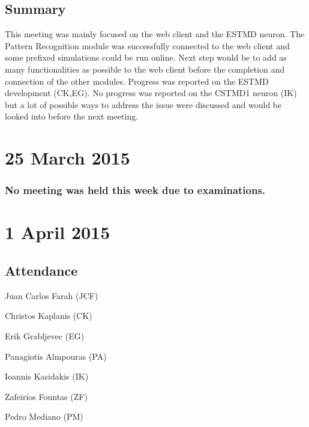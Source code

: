\documentclass[a4paper,11pt]{article}
\begin{document}
\subsection*{Summary}
This meeting was mainly focused on the web client and the ESTMD neuron. The Pattern Recognition module was successfully connected to the web client and some prefixed simulations could be run online. Next step would be to add as many functionalities as possible to the web client before the completion and connection of the other modules. Progress was reported on the ESTMD development (CK,EG). No progress was reported on the CSTMD1 neuron (IK) but a lot of possible ways to address the issue were discussed and would be looked into before the next meeting.

\maketitle
\section*{25 March 2015}
\subsubsection*{No meeting was held this week due to examinations.}

\maketitle
\section*{1 April 2015}
\subsection*{Attendance}
\begin{compactenum}
\item Juan Carlos Farah (JCF)
\item Christos Kaplanis (CK)
\item Erik Grabljevec (EG)
\item Panagiotis Almpouras (PA)
\item Ioannis Kasidakis (IK)
\item Zafeirios Fountas (ZF)
\item Pedro Mediano (PM)
\end{compactenum}
\end{document}
